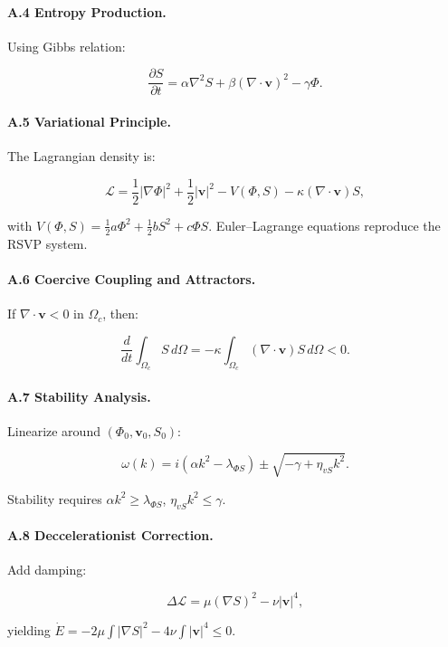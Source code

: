 \documentclass[12pt]{article}
\begin{document}
\paragraph{A.4 Entropy Production.}

Using Gibbs relation:

\[
\frac{\partial S}{\partial t} = \alpha \nabla^2 S + \beta (\nabla \cdot \mathbf{v})^2 - \gamma \Phi.
\]

\paragraph{A.5 Variational Principle.}

The Lagrangian density is:

\[
\mathcal{L} = \frac{1}{2} |\nabla \Phi|^2 + \frac{1}{2} |\mathbf{v}|^2 - V(\Phi, S) - \kappa (\nabla \cdot \mathbf{v}) S,
\]

with \( V(\Phi, S) = \frac{1}{2} a \Phi^2 + \frac{1}{2} b S^2 + c \Phi S \). Euler–Lagrange equations reproduce the RSVP system.

\paragraph{A.6 Coercive Coupling and Attractors.}

If \(\nabla \cdot \mathbf{v} < 0\) in \(\Omega_c\), then:

\[
\frac{d}{dt} \int_{\Omega_c} S \, d\Omega = -\kappa \int_{\Omega_c} (\nabla \cdot \mathbf{v}) S \, d\Omega < 0.
\]

\paragraph{A.7 Stability Analysis.}

Linearize around \((\Phi_0, \mathbf{v}_0, S_0)\):

\[
\omega(k) = i (\alpha k^2 - \lambda_{\Phi S}) \pm \sqrt{-\gamma + \eta_{vS} k^2}.
\]

Stability requires \(\alpha k^2 \geq \lambda_{\Phi S}\), \(\eta_{vS} k^2 \leq \gamma\).

\paragraph{A.8 Deccelerationist Correction.}

Add damping:

\[
\Delta \mathcal{L} = \mu (\nabla S)^2 - \nu |\mathbf{v}|^4,
\]

yielding \(\dot{E} = -2 \mu \int |\nabla S|^2 - 4 \nu \int |\mathbf{v}|^4 \leq 0\).
\end{document}
